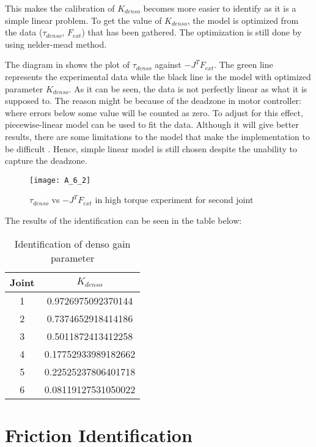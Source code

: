 This makes the calibration of $K_{denso}$ becomes more easier to identify as it is a simple linear problem. To get the value of $K_{denso}$, the model is optimized from the data ($\tau_{denso}$, $F_{ext}$) that has been gathered. The optimization is still done by using nelder-mead method. 

The diagram in  shows the plot of $\tau_{denso}$ against $- J^{T} F_{ext}$. The green line represents the experimental data while the black line is the model with optimized parameter $K_{denso}$. As it can be seen, the data is not perfectly linear as what it is supposed to. The reason might be because of the deadzone in motor controller: where errors below some value will be counted as zero. To adjust for this effect, piecewise-linear model can be used to fit the data. Although it will give better results, there are some limitations to the model that make the implementation to be difficult \cite{Nori15}. Hence, simple linear model is still chosen despite the unability to capture the deadzone. 

\begin{figure}[H]
    \centering
    \texttt{[image: A\_6\_2]}
    \caption{$\tau_{denso}$ vs $- J^{T} F_{ext}$ in high torque experiment for second joint}
    \label{fig: tor calibration}
\end{figure}

The results of the identification can be seen in the table below:
\begin{table}[H]
    \centering
    \begin{tabular}{| c | c |}
    \hline
    Joint & $K_{denso}$             \\ \hline
    1     & 0.9726975092370144      \\ \hline
    2     & 0.7374652918414186      \\ \hline
    3     & 0.5011872413412258      \\ \hline
    4     & 0.17752933989182662     \\ \hline
    5     & 0.22525237806401718     \\ \hline
    6     & 0.08119127531050022     \\ \hline
    \end{tabular}
    \caption{Identification of denso gain parameter}
    \label{table:denso_gain}
\end{table}

\section{Friction Identification}

